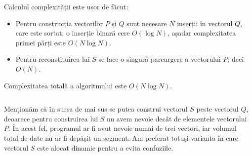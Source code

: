 Calculul complexității este ușor de făcut:

\begin{itemize}

\item Pentru construcția vectorilor $P$ și $Q$ sunt necesare $N$ inserții în
  vectorul $Q$, care este sortat; o inserție binară cere $O(\log N)$, așadar
  complexitatea primei părți este $O(N \log N)$.

\item Pentru reconstituirea lui $S$ se face o singură parcurgere a vectorului
  $P$, deci $O(N)$.

\end{itemize}

Complexitatea totală a algoritmului este $O(N \log N)$.

\inputminted{c}{src/problem13.c}

Menționăm că în sursa de mai sus se putea construi vectorul $S$ peste vectorul
$Q$, deoarece pentru construirea lui $S$ nu avem nevoie decât de elementele
vectorului $P$. În acest fel, programul ar fi avut nevoie numai de trei
vectori, iar volumul total de date nu ar fi depășit un segment. Am preferat
totuși varianta în care vectorul $S$ este alocat dinamic pentru a evita
confuziile.

